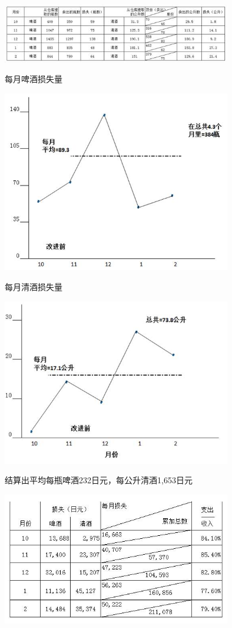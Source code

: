 
\includegraphics[width=10cm]{Club61.jpg}

每月啤酒损失量


\includegraphics[width=10cm]{club71.jpg}

每月清酒损失量


\includegraphics[width=10cm]{club72.jpg}

结算出平均每瓶啤酒232日元，每公升清酒1,653日元

\includegraphics[width=10cm]{club81.jpg}

